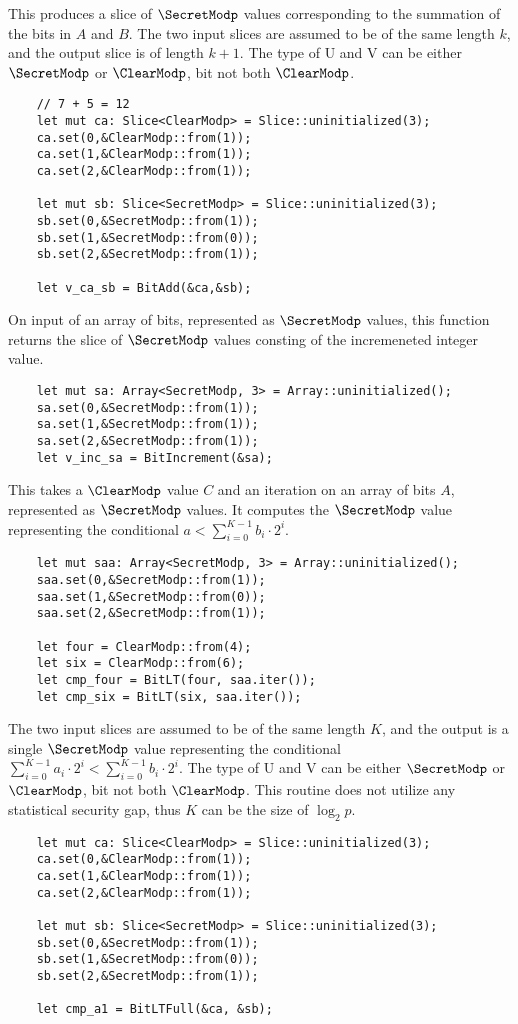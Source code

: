 This produces a slice of $\SecretModp$ values corresponding to the
summation of the bits in $A$ and $B$. The two input slices are assumed
to be of the same length $k$, and the output slice is of length $k+1$.
The type of U and V can be either $\SecretModp$ or $\ClearModp$,
bit not both $\ClearModp$.
\begin{lstlisting}
    // 7 + 5 = 12
    let mut ca: Slice<ClearModp> = Slice::uninitialized(3);
    ca.set(0,&ClearModp::from(1));
    ca.set(1,&ClearModp::from(1));
    ca.set(2,&ClearModp::from(1));

    let mut sb: Slice<SecretModp> = Slice::uninitialized(3);
    sb.set(0,&SecretModp::from(1));
    sb.set(1,&SecretModp::from(0));
    sb.set(2,&SecretModp::from(1));

    let v_ca_sb = BitAdd(&ca,&sb);
\end{lstlisting}

On input of an array of bits, represented as $\SecretModp$ values,
this function returns the slice of $\SecretModp$ values consting
of the incremeneted integer value.
\begin{lstlisting}
    let mut sa: Array<SecretModp, 3> = Array::uninitialized();
    sa.set(0,&SecretModp::from(1));
    sa.set(1,&SecretModp::from(1));
    sa.set(2,&SecretModp::from(1));
    let v_inc_sa = BitIncrement(&sa);
\end{lstlisting}

This takes a $\ClearModp$ value $C$ and an iteration on 
an array of bits $A$, represented as $\SecretModp$ values.
It computes the $\SecretModp$ value representing the conditional
$a < \sum_{i=0}^{K-1} b_i \cdot 2^i$.
\begin{lstlisting}
    let mut saa: Array<SecretModp, 3> = Array::uninitialized();
    saa.set(0,&SecretModp::from(1));
    saa.set(1,&SecretModp::from(0));
    saa.set(2,&SecretModp::from(1));

    let four = ClearModp::from(4);
    let six = ClearModp::from(6);
    let cmp_four = BitLT(four, saa.iter());
    let cmp_six = BitLT(six, saa.iter());
\end{lstlisting}

The two input slices are assumed to be of the same length $K$, and 
the output is a single $\SecretModp$ value representing the conditional
$\sum_{i=0}^{K-1} a_i \cdot 2^i < \sum_{i=0}^{K-1} b_i \cdot 2^i$.
The type of U and V can be either $\SecretModp$ or $\ClearModp$,
bit not both $\ClearModp$.
This routine does not utilize any statistical security gap, thus
$K$ can be the size of $\log_2 p$.
\begin{lstlisting}
    let mut ca: Slice<ClearModp> = Slice::uninitialized(3);
    ca.set(0,&ClearModp::from(1));
    ca.set(1,&ClearModp::from(1));
    ca.set(2,&ClearModp::from(1));

    let mut sb: Slice<SecretModp> = Slice::uninitialized(3);
    sb.set(0,&SecretModp::from(1));
    sb.set(1,&SecretModp::from(0));
    sb.set(2,&SecretModp::from(1));

    let cmp_a1 = BitLTFull(&ca, &sb);
\end{lstlisting}

